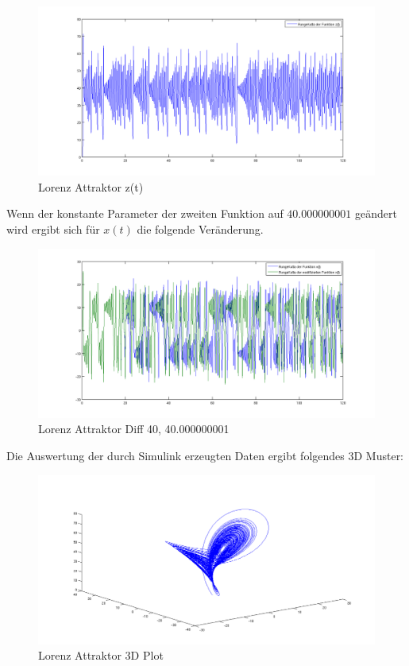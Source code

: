 \documentclass[10pt]{scrartcl}
\begin{document}
		\begin{figure}[H]
			\centering	
			\includegraphics[width=\textwidth]{lorenzzt.png}
            \caption{Lorenz Attraktor z(t)}
            \label{pic:zt}
		\end{figure} 
		
		Wenn der konstante Parameter der zweiten Funktion auf $40.000000001$ geändert wird ergibt sich für $x(t)$ die folgende Veränderung.  
		
		\begin{figure}[H]
			\centering	
			\includegraphics[width=\textwidth]{lorenzdif.png}
            \caption{Lorenz Attraktor Diff 40, 40.000000001}
            \label{pic:diff}
		\end{figure} 
		
		Die Auswertung der durch Simulink erzeugten Daten ergibt folgendes 3D Muster:
		\begin{figure}[H]
			\centering	
			\includegraphics[width=\textwidth]{lorenz3d.png}
            \caption{Lorenz Attraktor 3D Plot}
            \label{pic:3dplot}
		\end{figure} 
		
\end{document}
